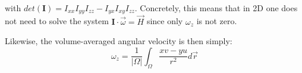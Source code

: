 with $det(\bm I)=I_{xx}I_{yy}I_{zz}-I_{yx}I_{xy}I_{zz}$.
Concretely, this means that in 2D one does not need to solve the system ${\bm I}\cdot \vec \omega = \vec H$
since only $\omega_z$ is not zero.

Likewise, the volume-averaged angular velocity is then simply:
\begin{equation}
\omega_z = \frac{1}{|\Omega|}\int_\Omega \frac{xv-yu}{r^2}d\vec r
\end{equation}

















